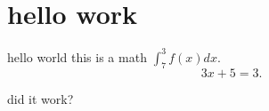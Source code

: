 \documentclass{amsart}
\begin{document}
\section{hello work}

	hello world this is a math $\int_7^3 f(x) dx$. 
	\[
		3x+5 = 3.
	\]





did it work?
\end{document}
